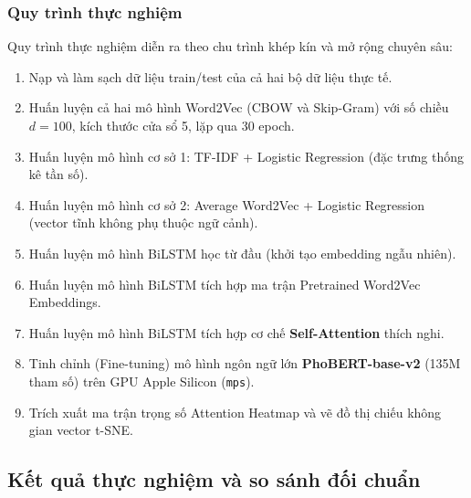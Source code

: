 \documentclass[12pt,a4paper]{article}
\begin{document}
\subsubsection{Quy trình thực nghiệm}\label{sec:experiment_pipeline}
Quy trình thực nghiệm diễn ra theo chu trình khép kín và mở rộng chuyên sâu:
\begin{enumerate}[leftmargin=1.0cm, itemsep=2pt]
    \item Nạp và làm sạch dữ liệu train/test của cả hai bộ dữ liệu thực tế.
    \item Huấn luyện cả hai mô hình Word2Vec (CBOW và Skip-Gram) với số chiều $d=100$, kích thước cửa sổ 5, lặp qua 30 epoch.
    \item Huấn luyện mô hình cơ sở 1: TF-IDF + Logistic Regression (đặc trưng thống kê tần số).
    \item Huấn luyện mô hình cơ sở 2: Average Word2Vec + Logistic Regression (vector tĩnh không phụ thuộc ngữ cảnh).
    \item Huấn luyện mô hình BiLSTM học từ đầu (khởi tạo embedding ngẫu nhiên).
    \item Huấn luyện mô hình BiLSTM tích hợp ma trận Pretrained Word2Vec Embeddings.
    \item Huấn luyện mô hình BiLSTM tích hợp cơ chế \textbf{Self-Attention} thích nghi.
    \item Tinh chỉnh (Fine-tuning) mô hình ngôn ngữ lớn \textbf{PhoBERT-base-v2} (135M tham số) trên GPU Apple Silicon (\texttt{mps}).
    \item Trích xuất ma trận trọng số Attention Heatmap và vẽ đồ thị chiếu không gian vector t-SNE.
\end{enumerate}

\subsection{Kết quả thực nghiệm và so sánh đối chuẩn}\label{sec:results_benchmarking}
\end{document}

